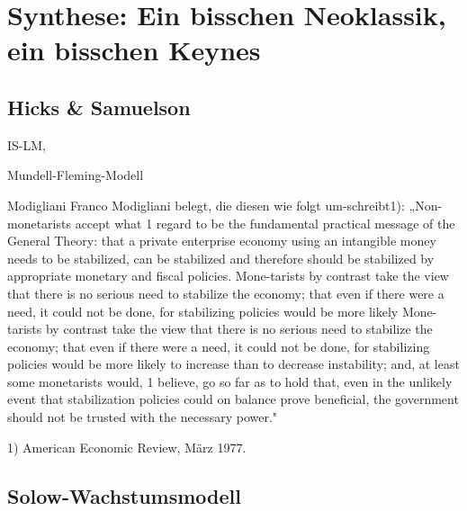 %
%
%

\chapter{Synthese: Ein bisschen Neoklassik, ein bisschen Keynes}
\label{Synthese}

\section{Hicks \& Samuelson}

IS-LM, 




Mundell-Fleming-Modell


Modigliani
Franco Modigliani belegt, die diesen wie folgt um-schreibt1): „Non-monetarists accept what 1 regard to be the fundamental practical message of the General Theory: that a private enterprise economy using an intangible money needs to be stabilized, can be stabilized and therefore should be stabilized by appropriate monetary and fiscal policies. Mone-tarists by contrast take the view that there is no serious need to stabilize the economy; that even if there were a need, it could not be done, for stabilizing policies would be more likely
Mone-tarists by contrast take the view that there is no serious need to stabilize the economy; that even if there were a need, it could not be done, for stabilizing policies would be more likely to increase than to decrease instability; and, at least some monetarists would, 1 believe, go so far as to hold that, even in the unlikely event that stabilization policies could on balance prove beneficial, the government should not be trusted with the necessary power."

1) American Economic Review, März 1977.






\section{Solow-Wachstumsmodell} \label{sec: Solow-Modell}

